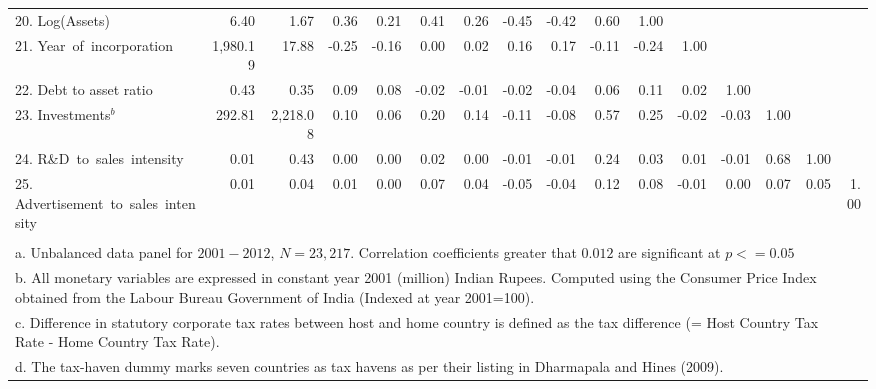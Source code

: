 \begin{table}[ht]
\begin{adjustwidth}{-1cm}{0cm}
{\begin{tabular}{lrrrrrrrrrrrrrrr}
20. Log(Assets) &     6.40 &     1.67  &   0.36  &   0.21  &   0.41  &   0.26  &  -0.45  &  -0.42  &   0.60  &   1.00  &     &     &     &     &    \\
21. Year~of~incorporation & 1,980.19 &    17.88  &  -0.25  &  -0.16  &   0.00  &   0.02  &   0.16  &   0.17  &  -0.11  &  -0.24  &   1.00  &     &     &     &    \\
22. Debt to asset ratio &     0.43 &     0.35  &   0.09  &   0.08  &  -0.02  &  -0.01  &  -0.02  &  -0.04  &   0.06  &   0.11  &   0.02  &   1.00  &     &     &    \\
23. Investments$^{b}$ &   292.81 & 2,218.08  &   0.10  &   0.06  &   0.20  &   0.14  &  -0.11  &  -0.08  &   0.57  &   0.25  &  -0.02  &  -0.03  &   1.00  &     &    \\
24. R\&D~to~sales~intensity &     0.01 &     0.43  &   0.00  &   0.00  &   0.02  &   0.00  &  -0.01  &  -0.01  &   0.24  &   0.03  &   0.01  &  -0.01  &   0.68  &   1.00  &    \\
25. Advertisement~to~sales~intensity &     0.01 &     0.04  &   0.01  &   0.00  &   0.07  &   0.04  &  -0.05  &  -0.04  &   0.12  &   0.08  &  -0.01  &   0.00  &   0.07  &   0.05  &   1.00 \\
\bottomrule 
\multicolumn{15}{l}{}\\
\multicolumn{15}{l}{a.	Unbalanced data panel for $2001-2012$, $N=23,217$. Correlation coefficients greater that $0.012$ are significant at $p <= 0.05$}\\
\multicolumn{15}{p{25cm}}{b.	All monetary variables are expressed in constant year 2001 (million) Indian Rupees. Computed using the Consumer Price Index obtained from
the Labour Bureau Government of India (Indexed at year 2001=100).}\\
\multicolumn{15}{p{25cm}}{c.	Difference in statutory corporate tax rates between host and home country is defined as the tax difference (= Host Country Tax Rate - Home Country Tax Rate).}\\
\multicolumn{15}{p{25cm}}{d.	The tax-haven dummy marks seven countries as tax havens as per their listing in Dharmapala and Hines (2009).}

\end{tabular}  
  }
  \end{adjustwidth}
  \end{table}



